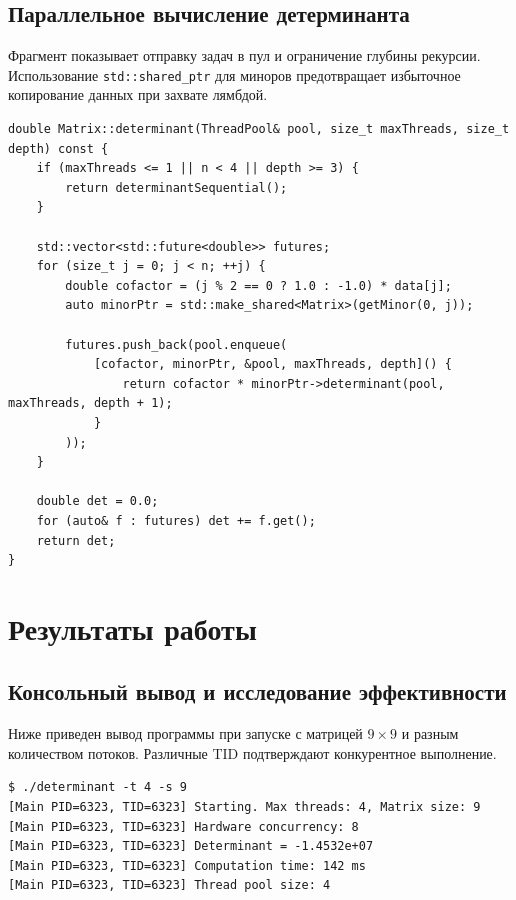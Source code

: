 \documentclass[12pt, a4paper]{article}
\begin{document}
\subsection{Параллельное вычисление детерминанта}

Фрагмент показывает отправку задач в пул и ограничение глубины рекурсии. Использование \texttt{std::shared\_ptr} для миноров предотвращает избыточное копирование данных при захвате лямбдой.

\begin{lstlisting}[caption={Рекурсивное вычисление с ограничением глубины}, label={lst:det}]
double Matrix::determinant(ThreadPool& pool, size_t maxThreads, size_t depth) const {
    if (maxThreads <= 1 || n < 4 || depth >= 3) {
        return determinantSequential();
    }
    
    std::vector<std::future<double>> futures;
    for (size_t j = 0; j < n; ++j) {
        double cofactor = (j % 2 == 0 ? 1.0 : -1.0) * data[j];
        auto minorPtr = std::make_shared<Matrix>(getMinor(0, j));
        
        futures.push_back(pool.enqueue(
            [cofactor, minorPtr, &pool, maxThreads, depth]() {
                return cofactor * minorPtr->determinant(pool, maxThreads, depth + 1);
            }
        ));
    }
    
    double det = 0.0;
    for (auto& f : futures) det += f.get();
    return det;
}
\end{lstlisting}

\newpage

\section{Результаты работы}

\subsection{Консольный вывод и исследование эффективности}

Ниже приведен вывод программы при запуске с матрицей $9 \times 9$ и разным количеством потоков. Различные TID подтверждают конкурентное выполнение.

\begin{verbatim}
$ ./determinant -t 4 -s 9
[Main PID=6323, TID=6323] Starting. Max threads: 4, Matrix size: 9
[Main PID=6323, TID=6323] Hardware concurrency: 8
[Main PID=6323, TID=6323] Determinant = -1.4532e+07
[Main PID=6323, TID=6323] Computation time: 142 ms
[Main PID=6323, TID=6323] Thread pool size: 4
\end{verbatim}
\end{document}
